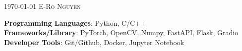 \documentclass[localFont,alternative]{yaac-another-awesome-cv}
\begin{document}
    \makecvheader
    \makecvfooter
        {\textsc{\today}}
        {\textsc{E-Ro Nguyen}}
        {\thepage}

    
    
    
    

    \begin{courses}
        \course
        {\textbf{Programming Languages}: Python, C/C++ \\
         \textbf{Frameworks/Library}: PyTorch, OpenCV, Numpy, FastAPI, Flask, Gradio \\
         \textbf{Developer Tools}: Git/Github, Docker, Jupyter Notebook}
    \end{courses}
    \vspace{-3mm}
    
    
    
    
\end{document}
